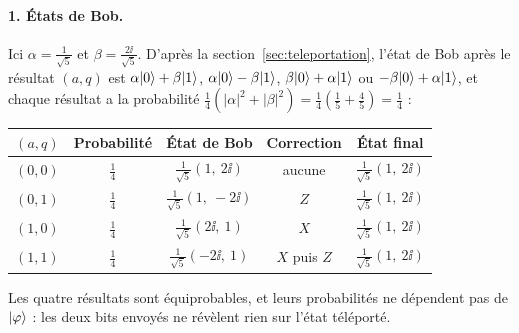 \begin{correction}
\paragraph{1. États de Bob.} Ici $\alpha=\frac{1}{\sqrt5}$ et $\beta=\frac{2\ii}{\sqrt5}$. D'après la
section~\ref{sec:teleportation}, l'état de Bob après le résultat $(a,q)$ est $\alpha|0\rangle+\beta|1\rangle$,
$\alpha|0\rangle-\beta|1\rangle$, $\beta|0\rangle+\alpha|1\rangle$ ou $-\beta|0\rangle+\alpha|1\rangle$, et chaque
résultat a la probabilité $\frac14(|\alpha|^2+|\beta|^2)=\frac14(\frac15+\frac45)=\frac14$ :
\begin{center}
\renewcommand{\arraystretch}{1.4}
\begin{tabular}{@{}c c c c c@{}}
\toprule
$(a,q)$ & Probabilité & État de Bob & Correction & État final \\
\midrule
$(0,0)$ & $\frac14$ & $\frac{1}{\sqrt5}(1,\ 2\ii)$ & aucune & $\frac{1}{\sqrt5}(1,\ 2\ii)$ \\
$(0,1)$ & $\frac14$ & $\frac{1}{\sqrt5}(1,\ -2\ii)$ & $Z$ & $\frac{1}{\sqrt5}(1,\ 2\ii)$ \\
$(1,0)$ & $\frac14$ & $\frac{1}{\sqrt5}(2\ii,\ 1)$ & $X$ & $\frac{1}{\sqrt5}(1,\ 2\ii)$ \\
$(1,1)$ & $\frac14$ & $\frac{1}{\sqrt5}(-2\ii,\ 1)$ & $X$ puis $Z$ & $\frac{1}{\sqrt5}(1,\ 2\ii)$ \\
\bottomrule
\end{tabular}
\end{center}
Les quatre résultats sont équiprobables, et leurs probabilités ne dépendent pas de $|\varphi\rangle$ :
les deux bits envoyés ne révèlent rien sur l'état téléporté.


\end{correction}

